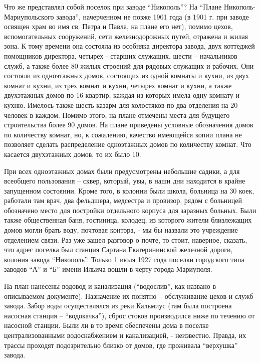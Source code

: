 
Что же представлял собой поселок при заводе \enquote{Никополь}? На \enquote{Плане
Никополь-Мариупольского завода}, начерченном не позже 1901 года (в 1901 г. при
заводе освящен храм во имя св. Петра и Павла, на плане  его нет), помимо цехов,
вспомогательных сооружений, сети железнодорожных путей, отражена и жилая зона.
К тому времени она состояла из особняка директора завода, двух коттеджей
помощников директора, четырех  - старших служащих, шести  – начальников служб,
а также более 80 жилых строений для рядовых служащих и рабочих. Они состояли из
одноэтажных домов, состоящих из одной комнаты и кухни, из двух комнат и кухни,
из трех комнат и кухни, четырех комнат и кухни, а также двухэтажных домов по 16
квартир, каждая из которых имела одну комнату и кухню. Имелось также шесть
казарм для холостяков по два отделения на 20 человек в каждом. Помимо этого, на
плане отмечены места для будущего строительства более 90 домов. На плане
приведены условные обозначения домов по количеству комнат, но, к сожалению,
качество имеющейся копии плана не позволяет сделать распределение одноэтажных
домов по количеству комнат. Что касается двухэтажных домов, то их было 10.


При всех одноэтажных домах были предусмотрены небольшие садики, а для всеобщего
пользования – сквер, который, увы, в наши дни находится в крайне запущенном
состоянии. Кроме того, в колонии были школа, больница на 30 коек, работали там
врач, два фельдшера, медсестра и провизор,  рядом с больницей обозначено место
для постройки отдельного корпуса для  заразных больных. Были также общественная
баня, гостиница, колодец, из которого жители близлежащих домов могли брать
воду, почтовая контора, - мы бы назвали это учреждение отделением связи. Раз
уже зашел разговор о почте, то стоит, наверное, сказать, что адрес поселка был
станция Сартана Екатерининской железной дороги, колония завода \enquote{Никополь}.
Только 1 июля 1927 года поселки городского типа заводов \enquote{А} и \enquote{Б} имени Ильича
вошли в черту города Мариуполя.

На план нанесены водовод и канализация (\enquote{водослив}, как названо в описываемом
документе). Назначение их понятно – обслуживание цехов и служб завода. Забор
воды осуществлялся из реки Кальмиус (там была построена насосная станция –
\enquote{водокачка}), сброс стоков производился ниже по течению от насосной станции.
Были ли в то время обеспечены дома в поселке централизованными водоснабжением и
канализацией, - неизвестно. Правда, их трассы проходят подозрительно близко от
домов, где проживала  \enquote{верхушка} завода. 

